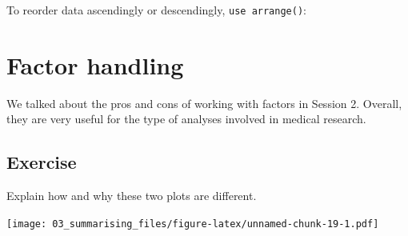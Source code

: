 \documentclass[]{book}
\makeatletter
\newenvironment{Shaded}{\begin{snugshade}}{\end{snugshade}}
\newcommand{\CommentTok}[1]{\textcolor[rgb]{0.56,0.35,0.01}{\textit{#1}}}
\newcommand{\DataTypeTok}[1]{\textcolor[rgb]{0.13,0.29,0.53}{#1}}
\newcommand{\KeywordTok}[1]{\textcolor[rgb]{0.13,0.29,0.53}{\textbf{#1}}}
\newcommand{\NormalTok}[1]{#1}
\newcommand{\OperatorTok}[1]{\textcolor[rgb]{0.81,0.36,0.00}{\textbf{#1}}}
\newcommand{\StringTok}[1]{\textcolor[rgb]{0.31,0.60,0.02}{#1}}
\newenvironment{kframe}{%
\medskip{}
\setlength{\fboxsep}{.8em}
 \def\at@end@of@kframe{}%
 \ifinner\ifhmode%
  \def\at@end@of@kframe{\end{minipage}}%
  \begin{minipage}{\columnwidth}%
 \fi\fi%
 \def\FrameCommand##1{\hskip\@totalleftmargin \hskip-\fboxsep
 \colorbox{shadecolor}{##1}\hskip-\fboxsep
     \hskip-\linewidth \hskip-\@totalleftmargin \hskip\columnwidth}%
 \MakeFramed {\advance\hsize-\width
   \@totalleftmargin\z@ \linewidth\hsize
   \@setminipage}}%
 {\par\unskip\endMakeFramed%
 \at@end@of@kframe}
\renewenvironment{Shaded}{\begin{kframe}}{\end{kframe}}
\theoremstyle{definition}
\theoremstyle{definition}
\theoremstyle{definition}
\theoremstyle{remark}
\makeatother
\begin{document}
To reorder data ascendingly or descendingly, \texttt{use\ arrange()}:

\begin{Shaded}
\end{Shaded}

\newpage

\hypertarget{factor-handling}{%
\section{Factor handling}\label{factor-handling}}

We talked about the pros and cons of working with factors in Session 2.
Overall, they are very useful for the type of analyses involved in
medical research.

\hypertarget{exercise-16}{%
\subsection{Exercise}\label{exercise-16}}

Explain how and why these two plots are different.

\begin{Shaded}
\end{Shaded}

\texttt{[image: 03\_summarising\_files/figure-latex/unnamed-chunk-19-1.pdf]}

\begin{Shaded}
\end{Shaded}
\end{document}
